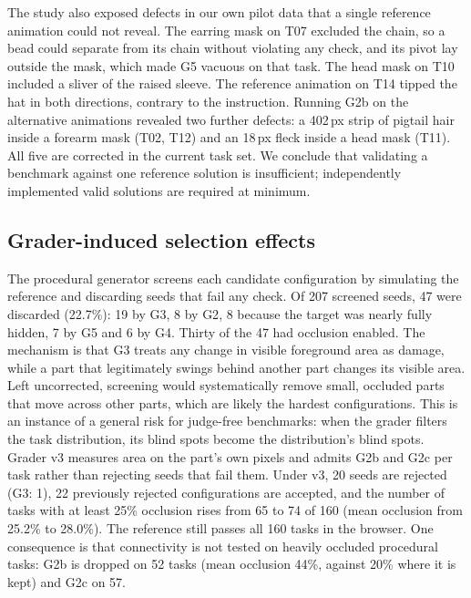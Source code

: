 \documentclass[11pt]{article}
\newcommand{\chk}[1]{\textsf{#1}}
\begin{document}
The study also exposed defects in our own pilot data that a single reference animation could not reveal. The earring mask on T07 excluded the chain, so a bead could separate from its chain without violating any check, and its pivot lay outside the mask, which made \chk{G5} vacuous on that task. The head mask on T10 included a sliver of the raised sleeve. The reference animation on T14 tipped the hat in both directions, contrary to the instruction. Running \chk{G2b} on the alternative animations revealed two further defects: a 402\,px strip of pigtail hair inside a forearm mask (T02, T12) and an 18\,px fleck inside a head mask (T11). All five are corrected in the current task set. We conclude that validating a benchmark against one reference solution is insufficient; independently implemented valid solutions are required at minimum.

\subsection{Grader-induced selection effects}
\label{sec:bias}

The procedural generator screens each candidate configuration by simulating the reference and discarding seeds that fail any check. Of 207 screened seeds, 47 were discarded (22.7\%): 19 by \chk{G3}, 8 by \chk{G2}, 8 because the target was nearly fully hidden, 7 by \chk{G5} and 6 by \chk{G4}. Thirty of the 47 had occlusion enabled. The mechanism is that \chk{G3} treats any change in visible foreground area as damage, while a part that legitimately swings behind another part changes its visible area. Left uncorrected, screening would systematically remove small, occluded parts that move across other parts, which are likely the hardest configurations. This is an instance of a general risk for judge-free benchmarks: when the grader filters the task distribution, its blind spots become the distribution's blind spots. Grader v3 measures area on the part's own pixels and admits \chk{G2b} and \chk{G2c} per task rather than rejecting seeds that fail them. Under v3, 20 seeds are rejected (\chk{G3}: 1), 22 previously rejected configurations are accepted, and the number of tasks with at least 25\% occlusion rises from 65 to 74 of 160 (mean occlusion from 25.2\% to 28.0\%). The reference still passes all 160 tasks in the browser. One consequence is that connectivity is not tested on heavily occluded procedural tasks: \chk{G2b} is dropped on 52 tasks (mean occlusion 44\%, against 20\% where it is kept) and \chk{G2c} on 57.
\end{document}
